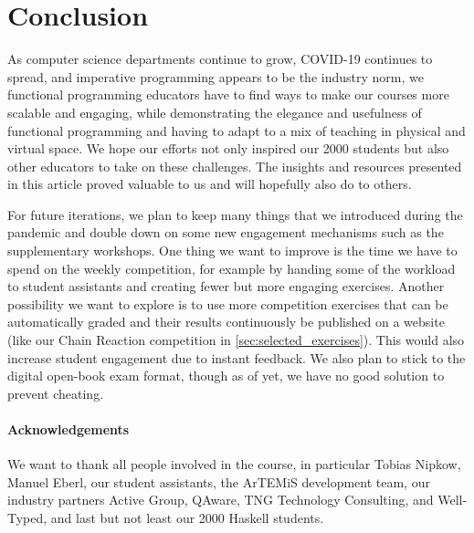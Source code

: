 \section{Conclusion}\label{sec:conclusion}

As computer science departments continue to grow,
COVID-19 continues to spread,
and imperative programming appears to be the industry norm,
we functional programming educators
have to find ways to make our courses more scalable and
engaging, while demonstrating the elegance and usefulness of functional programming and having to adapt to a mix of teaching in physical and virtual space.
We hope our efforts not only inspired our 2000 students
but also other educators to take on these challenges.
The insights and resources presented in this article proved valuable to us and will hopefully also do to others.

For future iterations,
we plan to keep many things that we introduced during the pandemic and double down on some new engagement mechanisms such as the supplementary workshops.
One thing we want to improve is the
time we have to spend on the weekly competition,
for example by handing some of the workload to student assistants and creating fewer but more engaging exercises.
Another possibility we want to explore is to use more
competition exercises that can be automatically graded
and their results continuously be published on a website (like our Chain Reaction competition in \cref{sec:selected_exercises}).
This would also increase student engagement due to instant feedback.
We also plan to stick to the digital open-book exam format,
though as of yet, we have no good solution to prevent cheating.

\paragraph{Acknowledgements}
We want to thank all people involved in the course,
in particular Tobias Nipkow,
Manuel Eberl,
our student assistants,
the ArTEMiS development team,
our industry partners
Active Group,
QAware,
TNG Technology Consulting,
and Well-Typed,
and last but not least our 2000 Haskell students.


